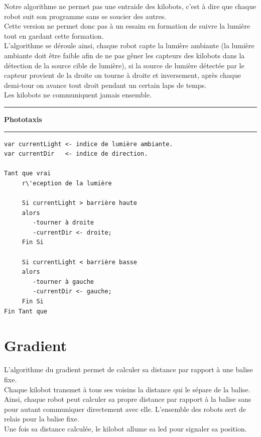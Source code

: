 \documentclass[a4paper,8pt]{report}
\begin{document}
\smallskip
Notre algorithme ne permet pas une entraide des kilobots, c'est \`a dire que chaque robot suit son programme sans se soucier des autres.\\
Cette version ne permet donc pas \`a un essaim en formation de suivre la lumi\`ere tout en gardant cette formation.\\
L'algorithme se d\'eroule ainsi, chaque robot capte la lumi\`ere ambiante (la lumi\`ere ambiante doit \^etre faible afin de ne pas g\^ener les capteurs des kilobots dans la d\'etection de la source cible de lumi\`ere), si la source de lumi\`ere d\'etect\'ee par le capteur provient de la droite on tourne \`a droite et inversement, apr\`es chaque demi-tour on avance tout droit pendant un certain laps de temps.\\
Les kilobots ne communiquent jamais ensemble.\\

\newpage
\begin{center}
  \rule{\linewidth}{.5pt}
  \textbf{Phototaxis}\\
  \rule{\linewidth}{.5pt}
\end{center}

\begin{verbatim}
var currentLight <- indice de lumière ambiante.
var currentDir   <- indice de direction.

Tant que vrai   
     r\'eception de la lumière

     Si currentLight > barrière haute
     alors
        -tourner à droite
        -currentDir <- droite;
     Fin Si
 
     Si currentLight < barrière basse
     alors
        -tourner à gauche
        -currentDir <- gauche;
     Fin Si
Fin Tant que
\end{verbatim}


\section*{Gradient}\label{sec:name}

L'algorithme du gradient permet de calculer sa distance par rapport à une balise fixe.\\
Chaque kilobot transmet à tous ses voisins la distance qui le s\'epare de la balise. Ainsi, chaque robot peut calculer sa propre distance par rapport à la balise sans pour autant communiquer directement avec elle. L'ensemble des robots sert de relais pour la balise fixe.\\
Une fois sa distance calcul\'ee, le kilobot allume sa led pour signaler sa position.
\end{document}
